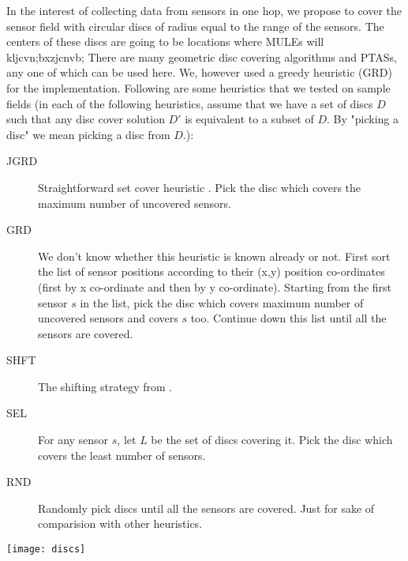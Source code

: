 In the interest of collecting data from sensors in one hop, we propose to cover the sensor field with circular discs of radius equal to the range of the sensors. The centers of these discs are going to be locations where MULEs will kljcvn;bxzjcnvb;
There are many \cite{gmdc} \cite{dudc} \cite{shifting} geometric disc covering algorithms and PTASs, any one of which can be used here. We, however used a greedy heuristic (GRD) for the implementation. Following are some heuristics that we tested on sample fields (in each of the following heuristics, assume that we have a set of discs $D$ such that any disc cover solution $D'$ is equivalent to a subset of $D$. By "picking a disc" we mean picking a disc from $D$.):
\begin{description}
\item[JGRD] Straightforward set cover heuristic \cite{jgreedy}. Pick the disc which covers the maximum number of uncovered sensors.
\item[GRD] We don't know whether this heuristic is known already or not. First sort the list of sensor positions according to their (x,y) position co-ordinates (first by x co-ordinate and then by y co-ordinate). Starting from the first sensor $s$ in the list, pick the disc which covers maximum number of uncovered sensors and covers $s$ too. Continue down this list until all the sensors are covered.
\item[SHFT] The shifting strategy from \cite{shifting}.
\item[SEL] For any sensor $s$, let $L$ be the set of discs covering it. Pick the disc which covers the least number of sensors.
\item[RND] Randomly pick discs until all the sensors are covered. Just for sake of comparision with other heuristics.
\end{description}

\texttt{[image: discs]}